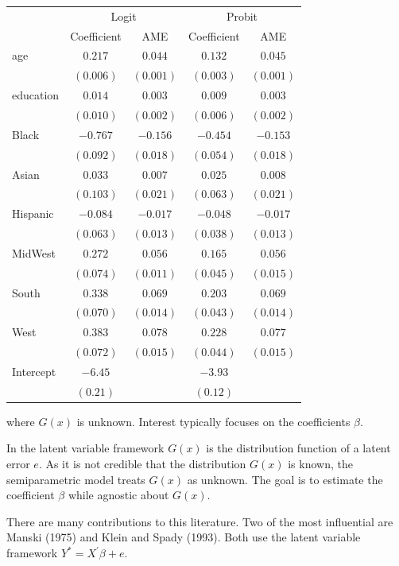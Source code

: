 \documentclass[10pt]{article}
\begin{document}
\begin{tabular}{lcccc}
\hline\hline
 & \multicolumn{2}{c}{Logit} & \multicolumn{2}{c}{Probit} \\
 & Coefficient & AME & Coefficient & AME \\
\cline { 2 - 5 }
age & $0.217$ & $0.044$ & $0.132$ & $0.045$ \\
 & $(0.006)$ & $(0.001)$ & $(0.003)$ & $(0.001)$ \\
education & $0.014$ & $0.003$ & $0.009$ & $0.003$ \\
 & $(0.010)$ & $(0.002)$ & $(0.006)$ & $(0.002)$ \\
Black & $-0.767$ & $-0.156$ & $-0.454$ & $-0.153$ \\
 & $(0.092)$ & $(0.018)$ & $(0.054)$ & $(0.018)$ \\
Asian & $0.033$ & $0.007$ & $0.025$ & $0.008$ \\
 & $(0.103)$ & $(0.021)$ & $(0.063)$ & $(0.021)$ \\
Hispanic & $-0.084$ & $-0.017$ & $-0.048$ & $-0.017$ \\
 & $(0.063)$ & $(0.013)$ & $(0.038)$ & $(0.013)$ \\
MidWest & $0.272$ & $0.056$ & $0.165$ & $0.056$ \\
 & $(0.074)$ & $(0.011)$ & $(0.045)$ & $(0.015)$ \\
South & $0.338$ & $0.069$ & $0.203$ & $0.069$ \\
 & $(0.070)$ & $(0.014)$ & $(0.043)$ & $(0.014)$ \\
West & $0.383$ & $0.078$ & $0.228$ & $0.077$ \\
 & $(0.072)$ & $(0.015)$ & $(0.044)$ & $(0.015)$ \\
Intercept & $-6.45$ &  & $-3.93$ &  \\
 & $(0.21)$ &  & $(0.12)$ &  \\
\hline
\end{tabular}

where $G(x)$ is unknown. Interest typically focuses on the coefficients $\beta$.

In the latent variable framework $G(x)$ is the distribution function of a latent error $e$. As it is not credible that the distribution $G(x)$ is known, the semiparametric model treats $G(x)$ as unknown. The goal is to estimate the coefficient $\beta$ while agnostic about $G(x)$.

There are many contributions to this literature. Two of the most influential are Manski (1975) and Klein and Spady (1993). Both use the latent variable framework $Y^{*}=X^{\prime} \beta+e$.
\end{document}
